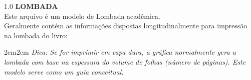 
\begin{titlepage}
  \thispagestyle{empty}
  \begin{center}
    
    \vspace*{2cm}
    
    \begin{spacing}{1.0}
      \noindent
      \textbf{LOMBADA} \\
      \vspace{1cm}
      Este arquivo é um modelo de Lombada acadêmica. \\
      Geralmente contém as informações dispostas longitudinalmente para impressão na lombada do livro:
      
      \vspace{2cm}
      
      {\MakeUppercase{\meuautor}} \hfill {\MakeUppercase{\meutitulo}} \hfill {\meuano}
      
      \vspace{4cm}
      
      \begin{adjustwidth}{2cm}{2cm}
        \small
        \textit{Dica: Se for imprimir em capa dura, a gráfica normalmente gera a lombada com base na espessura do volume de folhas (número de páginas). Este modelo serve como um guia conceitual.}
      \end{adjustwidth}
      
    \end{spacing}
    
  \end{center}
\end{titlepage}

